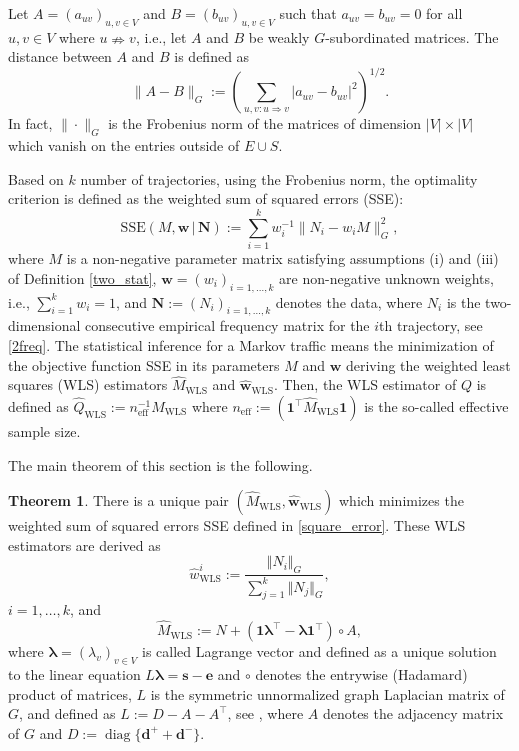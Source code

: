 \documentclass[b5paper,12pt]{report}
\theoremstyle{definition}
\newtheorem{Thm}{Theorem}
\newcommand{\bd}{\boldsymbol{d}}
\newcommand{\be}{\boldsymbol{e}}
\newcommand{\bs}{\boldsymbol{s}}
\newcommand{\bw}{\boldsymbol{w}}
\newcommand{\bN}{\boldsymbol{N}}
\newcommand{\blambda}{\boldsymbol{\lambda}}
\newcommand{\diag}{\operatorname{diag}}
\begin{document}
Let $A=(a_{uv})_{u,v\in V}$ and $B=(b_{uv})_{u,v\in V}$ such that $a_{uv}=b_{uv}=0$ for all $u,v\in V$ where $u\nRightarrow v$, i.e., let $A$ and $B$ be weakly $G$-subordinated matrices. The distance between $A$ and $B$ is defined as 
\[
    \| A-B\|_G := \left(\sum_{u,v:u\Rightarrow v} |a_{uv} - b_{uv}|^2\right)^{1/2}.
\]
In fact,  $\| \cdot\|_G$ is the Frobenius norm of the matrices of dimension $|V|\times |V|$ which vanish on the entries outside of $E\cup S$.

Based on $k$ number of trajectories, using the Frobenius norm, the optimality criterion is defined as the weighted sum of squared errors (SSE):
\begin{equation}\label{square_error}
    \text{SSE}(M,\bw\,|\,\bN) :=  \sum_{i=1}^k w_i^{-1} 
    \|N_i- w_i M\|_G^2,
\end{equation}
where $M$ is a non-negative parameter matrix satisfying assumptions (i) and (iii) of Definition \ref{two_stat}, $\bw=(w_i)_{i=1,\ldots,k}$ are non-negative unknown weights, i.e., $\sum_{i=1}^k w_i=1$, and $\bN:=(N_i)_{i=1,\ldots,k}$ denotes the data, where $N_i$ is the two-dimensional consecutive empirical frequency matrix for the $i$th trajectory, see \eqref{2freq}. The statistical inference for a Markov traffic means the minimization of the objective function SSE in its parameters $M$ and $\bw$ deriving the weighted least squares (WLS) estimators $\widehat{M}_{\textrm{WLS}}$ and $\widehat{\bw}_{\textrm{WLS}}$. Then, the WLS estimator of $Q$ is defined as $\widehat{Q}_{\textrm{WLS}}:= n_{\textrm{eff}}^{-1}\widehat{M}_{\textrm{WLS}}$ where $n_{\textrm{eff}} := (\textbf{1}^\top \widehat{M}_{\textrm{WLS}}\textbf{1})$ is the so-called effective sample size.

The main theorem of this section is the following.

\begin{Thm}\label{main_thm}
There is a unique pair $(\widehat{M}_{\textrm{WLS}},\widehat{\bw}_{\textrm{WLS}})$ which minimizes the weighted sum of squared errors SSE defined in \eqref{square_error}. These WLS estimators are derived as
\[
    \widehat{w}^i_{\textrm{WLS}} :=  
    \frac{\Vert N_i\Vert_G}{\sum_{j=1}^k \Vert N_j\Vert_G},
\]
$i=1,\ldots,k$, and
\[
    \widehat{M}_{\textrm{WLS}}:= N+(\textbf{1}\blambda^\top -\blambda\textbf{1}^\top)\circ A,
\] 
where $\blambda = (\lambda_v)_{v \in V}$ is called Lagrange vector and defined as a unique solution to the linear equation $L\blambda = \bs-\be$ and $\circ$ denotes the entrywise (Hadamard) product of matrices, $L$ is the symmetric unnormalized graph Laplacian matrix of $G$, and defined as $L:= D - A-A^\top$, see \cite{von2007tutorial}, where $A$ denotes the adjacency matrix of $G$ and $D:=\diag\{\bd^{+} + \bd^{-}\} $.
\end{Thm}
\end{document}
